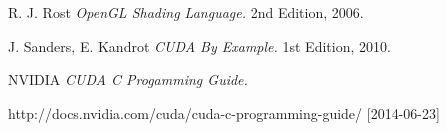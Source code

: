 \begin{thebibliography}{9}

  R. J. Rost
  \emph{OpenGL Shading Language.}
  2nd Edition,
  2006.

  J. Sanders, E. Kandrot
  \emph{CUDA By Example.}
  1st Edition,
  2010.

  NVIDIA
  \emph {CUDA C Progamming Guide.}

  http://docs.nvidia.com/cuda/cuda-c-programming-guide/ [2014-06-23]



\end{thebibliography}
